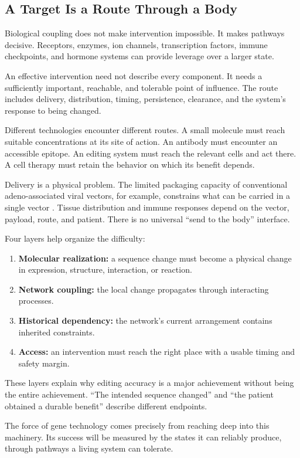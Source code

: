 \subsection{A Target Is a Route Through a Body}

Biological coupling does not make intervention impossible. It makes pathways decisive. Receptors, enzymes, ion channels, transcription factors, immune checkpoints, and hormone systems can provide leverage over a larger state.

An effective intervention need not describe every component. It needs a sufficiently important, reachable, and tolerable point of influence. The route includes delivery, distribution, timing, persistence, clearance, and the system's response to being changed.

Different technologies encounter different routes. A small molecule must reach suitable concentrations at its site of action. An antibody must encounter an accessible epitope. An editing system must reach the relevant cells and act there. A cell therapy must retain the behavior on which its benefit depends.

Delivery is a physical problem. The limited packaging capacity of conventional adeno-associated viral vectors, for example, constrains what can be carried in a single vector \cite{naso2017adeno}. Tissue distribution and immune responses depend on the vector, payload, route, and patient. There is no universal “send to the body” interface.

Four layers help organize the difficulty:
\begin{enumerate}
 \item \textbf{Molecular realization:} a sequence change must become a physical change in expression, structure, interaction, or reaction.
 \item \textbf{Network coupling:} the local change propagates through interacting processes.
 \item \textbf{Historical dependency:} the network's current arrangement contains inherited constraints.
 \item \textbf{Access:} an intervention must reach the right place with a usable timing and safety margin.
\end{enumerate}

These layers explain why editing accuracy is a major achievement without being the entire achievement. “The intended sequence changed” and “the patient obtained a durable benefit” describe different endpoints.

The force of gene technology comes precisely from reaching deep into this machinery. Its success will be measured by the states it can reliably produce, through pathways a living system can tolerate.
